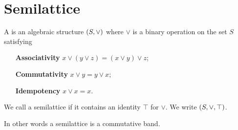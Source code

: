 \section{Semilattice}
\begin{definition}
A  is an algebraic structure $\left( S,\vee \right)$ where $\vee$ is a binary operation on the set $S$ satisfying
\begin{itemize}[leftmargin=2.5cm]
\item[\textbf{Associativity}] $x\vee (y\vee z) = (x\vee y) \vee z$;
\item[\textbf{Commutativity}] $x \vee y = y \vee x$;
\item[\textbf{Idempotency}] $x\vee x = x$.
\end{itemize}
We call a semilattice  if it contains an identity $\top$ for $\vee$. We write $\left( S, \vee, \top \right)$.
\end{definition}
In other words a semilattice is a commutative band.

